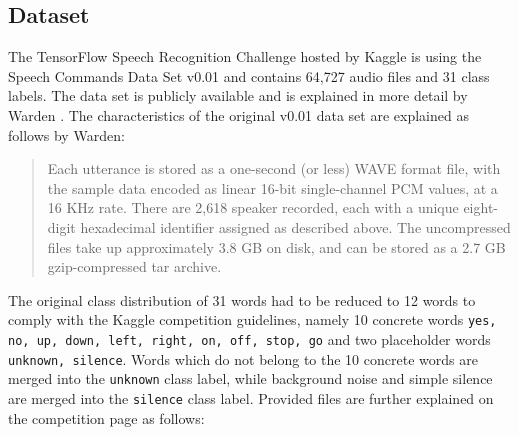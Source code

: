\documentclass{article}
\theoremstyle{definition}
\theoremstyle{remark}
\begin{document}
\subsection{Dataset}

The TensorFlow Speech Recognition Challenge hosted by Kaggle \cite{kaggle_challenge} is using the Speech Commands Data Set v0.01 and contains 64,727 audio files and 31 class labels. The data set is publicly available \cite{scd_v1} and is explained in more detail by Warden \cite{warden2018speech}. The characteristics of the original v0.01 data set are explained as follows by Warden:

\begin{quote}
Each utterance is stored as a one-second (or less) WAVE format file, with the sample data encoded as linear 16-bit single-channel PCM values, at a 16 KHz rate. There are 2,618 speaker recorded, each with a unique eight-digit hexadecimal identifier assigned as described above. The uncompressed files take up approximately 3.8 GB on disk, and can be stored as a 2.7 GB gzip-compressed tar archive.
\end{quote}

The original class distribution of 31 words had to be reduced to 12 words to comply with the Kaggle competition guidelines, namely 10 concrete words \texttt{yes, no, up, down, left, right, on, off, stop, go} and two placeholder words \texttt{unknown, silence}. Words which do not belong to the 10 concrete words are merged into the \texttt{unknown} class label, while background noise and simple silence are merged into the \texttt{silence} class label. Provided files are further explained on the competition page \cite{kaggle_challenge} as follows:
\end{document}
